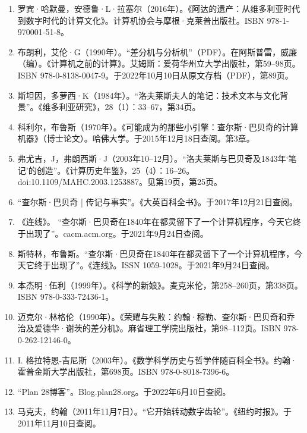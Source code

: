 \begin{enumerate}
\item 罗宾·哈默曼，安德鲁·L·拉塞尔（2016年）。《阿达的遗产：从维多利亚时代到数字时代的计算文化》。计算机协会与摩根·克莱普出版社。ISBN 978-1-970001-51-8。

\item 布朗利，艾伦·G（1990年）。“差分机与分析机”（PDF）。在阿斯普雷，威廉（编）。《计算机之前的计算》。艾姆斯：爱荷华州立大学出版社，第59–98页。ISBN 978-0-8138-0047-9。于2022年10月10日从原文存档（PDF），第89页。

\item 斯坦因，多萝西·K（1984年）。“洛夫莱斯夫人的笔记：技术文本与文化背景”。《维多利亚研究》，28（1）：33–67，第34页。

\item 科利尔，布鲁斯（1970年）。《可能成为的那些小引擎：查尔斯·巴贝奇的计算机器》（博士论文）。哈佛大学。于2015年12月18日查阅。第3章。

\item 弗尤吉，J，弗朗西斯·J（2003年10–12月）。“洛夫莱斯与巴贝奇及1843年‘笔记’的创造”。《计算历史年鉴》，25（4）：16–26。doi:10.1109/MAHC.2003.1253887。见第19页，第25页。

\item “查尔斯·巴贝奇 | 传记与事实”。《大英百科全书》。于2017年12月21日查阅。

\item 《连线》。 “查尔斯·巴贝奇在1840年在都灵留下了一个计算机程序，今天它终于出现了”。cacm.acm.org。于2021年9月24日查阅。

\item 斯特林，布鲁斯。“查尔斯·巴贝奇在1840年在都灵留下了一个计算机程序，今天它终于出现了”。《连线》。ISSN 1059-1028。于2021年9月24日查阅。

\item 本杰明·伍利（1999年）。《科学的新娘》。麦克米伦，第258–260页，第338页。ISBN 978-0-333-72436-1。

\item 迈克尔·林格伦（1990年）。《荣耀与失败：约翰·穆勒、查尔斯·巴贝奇和乔治及爱德华·谢茨的差分机》。麻省理工学院出版社，第98–112页。ISBN 978-0-262-12146-0。

\item I. 格拉特恩-吉尼斯（2003年）。《数学科学历史与哲学伴随百科全书》。约翰·霍普金斯大学出版社，第698页。ISBN 978-0-8018-7396-6。

\item “Plan 28博客”。Blog.plan28.org。于2022年6月10日查阅。

\item 马克夫，约翰（2011年11月7日）。“它开始转动数字齿轮”。《纽约时报》。于2011年11月10日查阅。
\end{enumerate}